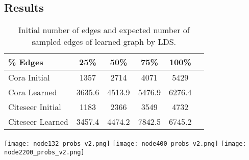 \documentclass{article}
\newcommand{\lds}{\textsc{LDS}\xspace}
\begin{document}
\subsection{Results}
\label{sec:withgraph}



\begin{table}[t]
\small
\vspace{-2mm}
\begin{center}
\caption{Initial number of edges and expected number of sampled edges of learned graph by \lds.}
\vspace{1mm}
\label{tab:ense}
\begin{tabular}{lccccc}
\toprule
\% Edges    & 25\%   & 50\%   & 75\%   & 100\% \\
\midrule
Cora Initial     & 1357 & 2714 & 4071 & 5429 \\
Cora Learned     & 3635.6 & 4513.9 & 5476.9 & 6276.4 \\
\midrule
Citeseer Initial & 1183 & 2366 & 3549 & 4732\\
Citeseer Learned & 3457.4 & 4474.2 & 7842.5 & 6745.2 \\
\bottomrule
\end{tabular}
\end{center}
\vspace{-7mm}
\end{table}

\begin{figure*}[tb]
    \centering
    \texttt{[image: node132\_probs\_v2.png]}
\texttt{[image: node400\_probs\_v2.png]}
\texttt{[image: node2200\_probs\_v2.png]}
    \vspace{-8mm}
    \caption{Mean edge probabilities to nodes aggregated w.r.t. four groups during \lds optimization, in  scale for three example nodes. For each example node, all other nodes are grouped by the following criteria: (a) adjacent in the ground truth graph; (b) same class membership; (c) different class membership; and (d) unknown class membership. Probabilities are computed with \lds () on Cora with  retained edges. From left to right, the example nodes belong to the training, validation, and test set, respectively. The vertical gray lines indicate when the inner optimization dynamics restarts, that is, when the weights of the GCN are reinitialized.}
    \label{fig:meanprobs}
    \vspace{-5mm}
\end{figure*}
\end{document}
